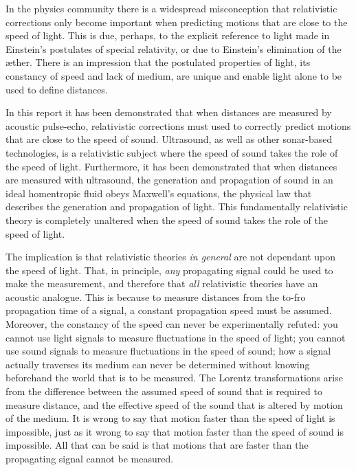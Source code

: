 \documentclass[10pt, fleqn,final,showtrims,oldfontcommands, article,a4paper,oneside]{memoir} %
\newcommand{\aether}{\ae ther}
\begin{document}
In the physics community there is a widespread misconception that
relativistic corrections only become important  when predicting  motions that are close to the speed of light.
This is  due, perhaps, to the explicit reference to light made in Einstein's postulates of special relativity,
or due to Einstein's elimination of the \aether.
There is an impression that the postulated properties of light, its  constancy of speed and lack of medium,
are unique
and 
enable light alone to be used to define  distances.




In this report it has been demonstrated that
 when distances are measured by acoustic pulse-echo, %
 relativistic corrections must used to correctly predict motions that  are close to the speed of sound.
Ultrasound, as well as other sonar-based technologies, is  a relativistic subject
where  the  speed of sound takes the role of the speed of light.
Furthermore, it has been demonstrated that  when distances are measured with ultrasound, %
the generation and propagation of sound in an ideal homentropic fluid
obeys  Maxwell's equations, the  physical law that describes the generation and propagation of light.
This  fundamentally relativistic theory is completely unaltered when the speed of sound takes the role of the speed of light.

The implication is that relativistic theories {\em in general} are not dependant upon the speed of light.
That, in principle, {\em any} propagating signal could be used to make the measurement,
and therefore that  {\em all} relativistic theories have an acoustic analogue.
This is because to measure distances from the to-fro propagation time of a signal, 
a constant propagation speed must be assumed.
Moreover, the constancy of the speed can never be experimentally refuted: you cannot use light signals to measure fluctuations in the speed of light;
you cannot use sound signals to measure fluctuations in the speed of sound;
how a signal  actually traverses its medium can never be determined without knowing beforehand the world that is to be measured.
The Lorentz transformations arise from the difference between the assumed speed of sound that is required to measure distance,
and the effective speed of the sound that is altered by motion of the  medium.
It is  wrong to say that motion faster than the speed of light is impossible,
just as it wrong  to say that motion faster than the speed of sound is impossible.
All that can be said is that motions that are faster than the  propagating signal cannot be measured.
\end{document}
